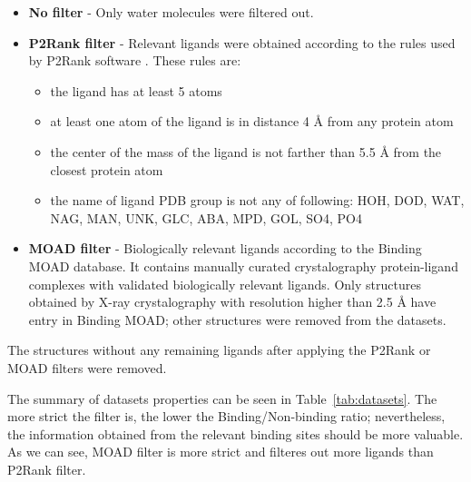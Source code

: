 \begin{itemize}
\item \textbf{No filter} - Only water molecules were filtered out.
\item \textbf{P2Rank filter} - Relevant ligands were obtained according to the rules used by P2Rank software \cite{p2rank1}. These rules are:
	\begin{itemize}
	\item the ligand has at least 5 atoms
	\item at least one atom of the ligand is in distance 4 {\AA} from any protein atom
	\item the center of the mass of the ligand is not farther than 5.5 {\AA} from the closest protein atom
	\item the name of ligand PDB group is not any of following: HOH, DOD, WAT, NAG, MAN, UNK, GLC, ABA, MPD, GOL, SO4, PO4
	\end{itemize}
\item \textbf{MOAD filter} - Biologically relevant ligands according to the Binding MOAD \cite{moad} database. It contains manually curated crystalography protein-ligand complexes with validated biologically relevant ligands. Only structures obtained by X-ray crystalography with resolution higher than 2.5 {\AA} have entry in Binding MOAD; other structures were removed from the datasets.
\end{itemize}

The structures without any remaining ligands after applying the P2Rank or MOAD filters were removed.

The summary of datasets properties can be seen in Table~\ref{tab:datasets}. The more strict the filter is, the lower the Binding/Non-binding ratio; nevertheless, the information obtained from the relevant binding sites should be more valuable. As we can see, MOAD filter is more strict and filteres out more ligands than P2Rank filter.

